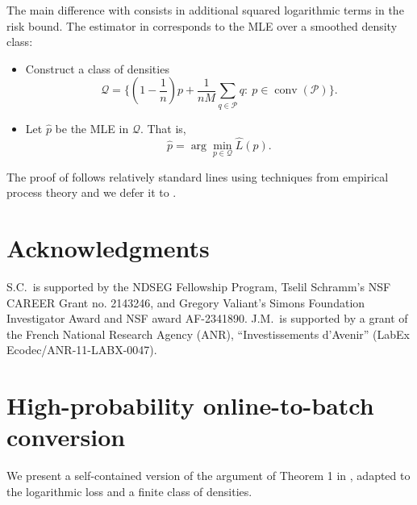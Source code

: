 \documentclass[11pt]{article}
\newcommand{\wh}{\widehat}
\newcommand{\Qs}{\mathcal{Q}}
\theoremstyle{definition}
\theoremstyle{remark}
\begin{document}
The main difference with  consists in additional squared logarithmic terms in the risk bound. 
The estimator in  corresponds to the MLE over a smoothed density class:
\begin{framed}
\begin{itemize}
\item Construct a class of densities 
\[
\Qs
=
\bigg\{
\left(1 - \frac{1}{n}\right)p
+ \frac{1}{nM}\sum_{q \in \mathcal{P}} q
:\ p \in \operatorname{conv}(\mathcal{P})
\bigg\}.
\]
\item Let $\widehat{p}$ be the MLE in $\Qs$. That is,
\[
\widehat{p} = \arg\min_{p \in \Qs}\wh L(p).
\]
\end{itemize}
\end{framed}

The proof of  follows relatively standard lines using techniques from empirical process theory and we defer it to . 

\section{Acknowledgments}
S.C.~is supported by the NDSEG Fellowship Program, Tselil Schramm’s NSF CAREER Grant no. 2143246, and Gregory Valiant’s Simons Foundation Investigator Award and NSF award AF-2341890.
J.M.~is supported by a grant of the French National Research Agency (ANR), ``Investissements d’Avenir'' (LabEx Ecodec/ANR-11-LABX-0047).


{
  \small

}
\appendix


\section{High-probability online-to-batch conversion}
\label{sec:highprobabilityonlinetobatch}
We present a self-contained version of the argument of Theorem 1 in \cite{vanderhoeven2023high}, adapted to the logarithmic loss and a finite class of densities. 
\end{document}
